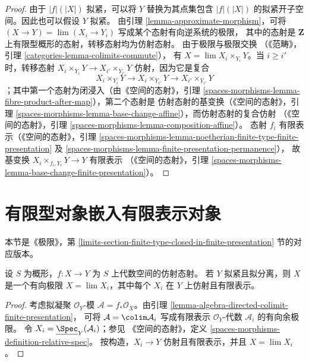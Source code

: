 \begin{proof}
由于 $|f|(|X|)$ 拟紧，可以将 $Y$ 替换为其点集包含
$|f|(|X|)$ 的拟紧开子空间。因此也可以假设 $Y$ 拟紧。
由引理 \ref{lemma-approximate-morphism}，可将
$(X \to Y) = \lim (X_i \to Y_i)$ 写成某个态射有向逆系统的极限，
其中的态射是 $\mathbf{Z}$ 上有限型概形的态射，转移态射均为仿射态射。
由于极限与极限交换
（《范畴》，引理 \ref{categories-lemma-colimits-commute}），
有 $X = \lim X_i \times_{Y_i} Y$。当 $i \geq i'$ 时，转移态射
$X_i \times_{Y_i} Y \to X_{i'} \times_{Y_{i'}} Y$ 仿射，因为它是复合
$$
X_i \times_{Y_i} Y \to X_i \times_{Y_{i'}} Y \to X_{i'} \times_{Y_{i'}} Y
$$
；其中第一个态射为闭浸入（由《空间的态射》，引理
\ref{spaces-morphisms-lemma-fibre-product-after-map}），第二个态射是
仿射态射的基变换（《空间的态射》，引理
\ref{spaces-morphisms-lemma-base-change-affine}），而仿射态射的复合仿射
（《空间的态射》，引理
\ref{spaces-morphisms-lemma-composition-affine}）。
态射 $f_i$ 有限表示（《空间的态射》，引理
\ref{spaces-morphisms-lemma-noetherian-finite-type-finite-presentation} 及
\ref{spaces-morphisms-lemma-finite-presentation-permanence}），
故基变换 $X_i \times_{f_i,Y_i} Y \to Y$ 有限表示
（《空间的态射》，引理
\ref{spaces-morphisms-lemma-base-change-finite-presentation}）。
\end{proof}






\section{有限型对象嵌入有限表示对象}
\label{section-finite-type-closed-in-finite-presentation}

\noindent
本节是《极限》，第
\ref{limits-section-finite-type-closed-in-finite-presentation} 节的对应版本。

\begin{lemma}
\label{lemma-affine-morphism-is-limit}
设 $S$ 为概形，$f : X \to Y$ 为 $S$ 上代数空间的仿射态射。
若 $Y$ 拟紧且拟分离，则 $X$ 是一个有向极限
$X = \lim X_i$，其中每个 $X_i$ 在 $Y$ 上仿射且有限表示。
\end{lemma}

\begin{proof}
考虑拟凝聚 $\mathcal{O}_Y$-模
$\mathcal{A} = f_*\mathcal{O}_X$。由引理
\ref{lemma-algebra-directed-colimit-finite-presentation}，
可将 $\mathcal{A} = \colim \mathcal{A}_i$ 写成有限表示
$\mathcal{O}_Y$-代数 $\mathcal{A}_i$ 的有向余极限。
令 $X_i = \underline{\Spec}_Y(\mathcal{A}_i)$；参见
《空间的态射》，定义
\ref{spaces-morphisms-definition-relative-spec}。
按构造，$X_i \to Y$ 仿射且有限表示，并且 $X = \lim X_i$。
\end{proof}

